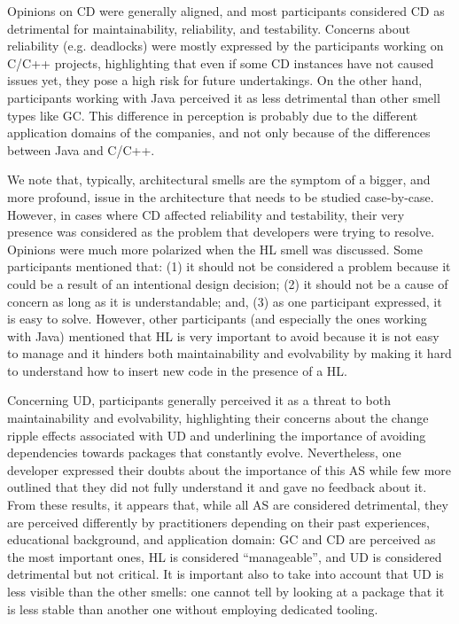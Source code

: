 Opinions on CD were generally aligned, and most participants considered CD as detrimental for maintainability, reliability, and testability. Concerns about reliability (e.g. deadlocks) were mostly expressed by the participants working on C/C++ projects, highlighting that even if some CD instances have not caused issues yet, they pose a high risk for future undertakings. On the other hand, participants working with Java perceived it as less detrimental than other smell types like GC. This difference in perception is probably due to the different application domains of the companies, and not only because of the differences between Java and C/C++.

We note that, typically, architectural smells are the symptom of a bigger, and more profound, issue in the architecture  \cite{Lippert2006} that needs to be studied case-by-case. However, in cases where CD affected reliability and testability, their very presence was considered as the problem that developers were trying to resolve.  
Opinions were much more polarized when the HL smell was discussed. Some participants mentioned that: (1) it should not be considered a problem because it could be a result of an intentional design decision; (2) it should not be a cause of concern as long as it is understandable;  and, (3) as one participant expressed, it is easy to solve. However, other participants (and especially the ones working with Java) mentioned that HL is very important to avoid because it is not easy to manage and it hinders both maintainability and evolvability by making it hard to understand how to insert new code in the presence of a HL. 

Concerning UD, participants generally perceived it as a threat to both maintainability and evolvability, highlighting their concerns about the change ripple effects associated with UD and underlining the importance of avoiding dependencies towards packages that constantly evolve. Nevertheless, one developer expressed their doubts about the importance of this AS while few more outlined that they did not fully understand it and gave no feedback about it.
From these results, it appears that, while all AS are considered detrimental, they are perceived differently by practitioners depending on their past experiences, educational background, and application domain: GC and CD are perceived as the most important ones, HL is considered “manageable”, and UD is considered detrimental but not critical. It is important also to take into account that UD is less visible than the other smells:  one cannot tell by looking at a package that it is less stable than another one without employing dedicated tooling. 

